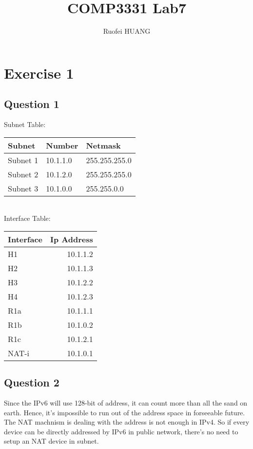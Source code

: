 \documentclass{article}
\begin{document}
\title{COMP3331 Lab7}
\author{Ruofei HUANG}

\maketitle

\section{Exercise 1}

\subsection{Question 1}
Subnet Table:\\
\begin{tabular}{l l l}
    Subnet&Number&Netmask\\
    \hline
    Subnet 1& 10.1.1.0 & 255.255.255.0\\
    Subnet 2& 10.1.2.0 & 255.255.255.0\\
    Subnet 3& 10.1.0.0 & 255.255.0.0\\
\end{tabular}\\
Interface Table:\\
\begin{tabular}{l r}
    Interface & Ip Address\\
    \hline
    H1    & 10.1.1.2 \\
    H2    & 10.1.1.3 \\
    H3    & 10.1.2.2 \\
    H4    & 10.1.2.3 \\
    R1a   & 10.1.1.1 \\
    R1b   & 10.1.0.2 \\
    R1c   & 10.1.2.1 \\
    NAT-i & 10.1.0.1 \\
\end{tabular}

\subsection{Question 2}

Since the IPv6 will use 128-bit of address, it can count more than all the sand on earth. 
Hence, it's impossible to run out of the address space in forseeable future. The NAT machnism
is dealing with the address is not enough in IPv4. So if every device can be directly addressed
by IPv6 in public network, there's no need to setup an NAT device in subnet.
\end{document}
